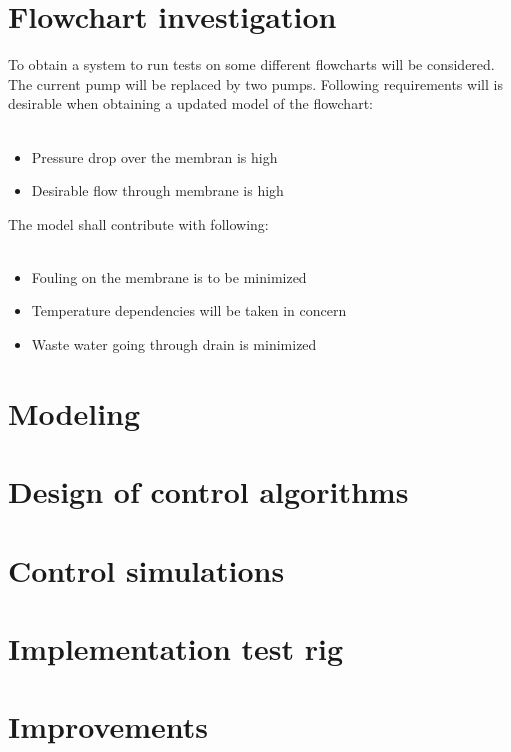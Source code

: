
\section{Flowchart investigation}
To obtain a system to run tests on some different flowcharts will be considered. The current pump will be replaced by two pumps. Following requirements will is desirable when obtaining a updated model of the flowchart:\\
\\
\begin{itemize}
\renewcommand\labelitemi{-}
\item Pressure drop over the membran is high
\item Desirable flow through membrane is high
\end{itemize}
The model shall contribute with following:\\
\\
\begin{itemize}
\renewcommand\labelitemi{-}
\item Fouling on the membrane is to be minimized
\item Temperature dependencies will be taken in concern
\item Waste water going through drain is minimized
\end{itemize}


\section{Modeling}


\section{Design of control algorithms}

\section{Control simulations}

\section{Implementation test rig}

\section{Improvements}

